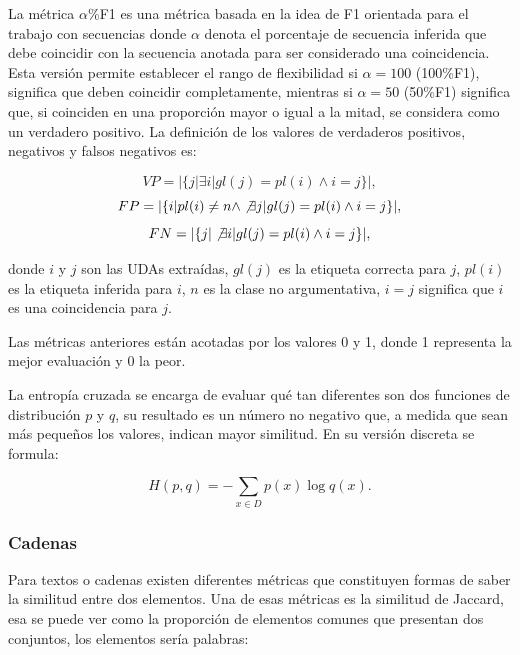 \documentclass[a4paper,11pt,twocolumn,twoside]{article}
\begin{document}
La métrica $\alpha$\%F1 \cite{persing2016end} es una métrica basada en la idea de F1 orientada para el 
trabajo con secuencias donde $\alpha$ denota el porcentaje de secuencia inferida que debe coincidir con 
la secuencia anotada para ser considerado una coincidencia. Esta versión permite
establecer el rango de flexibilidad si $\alpha=100$ (100\%F1), significa que deben coincidir completamente, 
mientras si $\alpha = 50$ (50\%F1) significa que, si coinciden en una proporción mayor o igual a la mitad, 
se considera como un verdadero positivo. La definición de los valores de verdaderos positivos, negativos 
y falsos negativos es:

\begin{equation}
	VP = |\{ j | \exists i | gl(j) = pl(i) \land i = j \}|,
\end{equation}
\begin{equation}
	FP = |\{ i | pl(i) \neq n \land \not\exists j | gl(j) = pl(i) \land i = j \}|,
\end{equation}
\begin{equation}
	FN = |\{ j | \not\exists i | gl(j) = pl(i) \land i = j \}|,
\end{equation}

donde $i$ y $j$ son las UDAs extraídas, $gl(j)$ es la etiqueta correcta para $j$, $pl(i)$ es 
la etiqueta inferida para $i$, $n$ es la clase no argumentativa, $i = j$ significa que $i$ es 
una coincidencia para $j$.

Las métricas anteriores están acotadas por los valores 0 y 1, donde 1 representa la mejor evaluación y 0 la 
peor.

La entropía cruzada se encarga de evaluar qué tan diferentes son dos funciones de distribución $p$ y $q$, su 
resultado es un número no negativo que, a medida que sean más pequeños los valores, indican mayor similitud. 
En su versión discreta se formula:

\begin{equation}
	H(p, q) = - \sum_{x \in D} p(x) \log q(x).
\end{equation}

\subsubsection{Cadenas}

Para textos o cadenas existen diferentes métricas que constituyen formas de saber la similitud 
entre dos elementos. Una de esas métricas es la similitud de Jaccard, esa se puede ver como 
la proporción de elementos comunes que presentan dos conjuntos, los elementos sería palabras:
\end{document}
